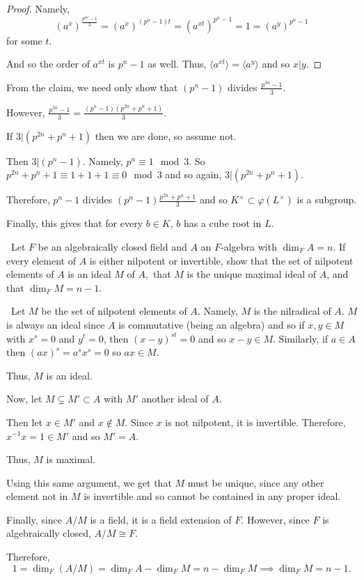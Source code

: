 \documentclass[12pt]{AlgebraQual}
\begin{document}
\begin{solution}
\begin{claim}
\begin{proof}
Namely, $$(a^x)^\frac{p^{3n}-1}{3}=(a^x)^{(p^n-1)t}=(a^{xt})^{p^n-1}=1=(a^y)^{p^n-1}$$ for some $t.$

And so the order of $a^{xt}$ is $p^n-1$ as well. Thus, $\langle a^{xt}\rangle=\langle a^y\rangle$ and so $x|y.$
\end{proof}
\end{claim}

From the claim, we need only show that $(p^n-1)$ divides $\frac{p^{3n}-1}{3}$.

However, $\frac{p^{3n}-1}{3}=\frac{(p^n-1)(p^{2n}+p^n+1)}{3}$.

If $3|(p^{2n}+p^n+1)$ then we are done, so assume not.

Then $3|(p^n-1)$. Namely, $p^n\equiv 1\mod 3$. So $p^{2n}+p^n+1\equiv 1+1+1\equiv 0\mod 3$ and so again, $3|(p^{2n}+p^n+1)$.

Therefore, $p^n-1$ divides $(p^n-1)\frac{p^{2n}+p^n+1}{3}$ and so $K^\times\subset\varphi(L^\times)$ is a subgroup.

Finally, this gives that for every $b\in K$, $b$ has a cube root in $L$.
\end{solution}
\newpage



\begin{problem} $\,$
Let $F$ be an algebraically closed field and $A$ an $F$-algebra with $\dim_FA=n$. If every element of $A$ is either nilpotent or invertible, show that the set of nilpotent elements of $A$ is an ideal $M$ of $A,$ that $M$ is the unique maximal ideal of $A$, and that $\dim_FM=n-1.$
\end{problem}


\begin{solution}$\,$
Let $M$ be the set of nilpotent elements of $A$. Namely, $M$ is the nilradical of $A$. $M$ is always an ideal since $A$ is commutative (being an algebra) and so if $x,y\in M$ with $x^s=0$ and $y^t=0$, then $(x-y)^{st}=0$ and so $x-y\in M.$ Similarly, if $a\in A$ then $(ax)^s=a^sx^s=0$ so $ax\in M$.

Thus, $M$ is an ideal.

Now, let $M\subsetneq M'\subset A$ with $M'$ another ideal of $A$.

Then let $x\in M'$ and $x\notin M$. Since $x$ is not nilpotent, it is invertible. Therefore, $x^{-1}x=1\in M'$ and so $M'=A$.

Thus, $M$ is maximal.

Using this same argument, we get that $M$ must be unique, since any other element not in $M$ is invertible and so cannot be contained in any proper ideal.

Finally, since $A/M$ is a field, it is a field extension of $F$. However, since $F$ is algebraically closed, $A/M\cong F$.

Therefore, $$1=\dim_F(A/M)=\dim_FA-\dim_FM=n-\dim_FM\implies \dim_FM=n-1.$$
\end{solution}
\newpage
\end{document}
